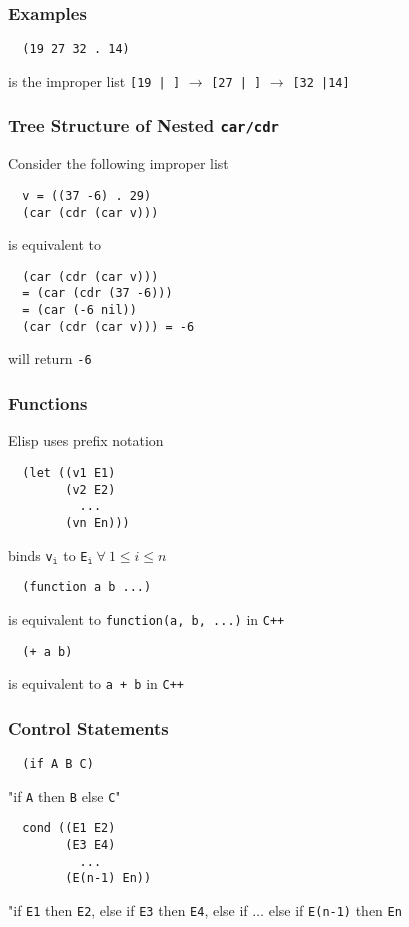 \documentclass[13pt]{article}
\begin{document}
\subsubsection*{Examples}
\begin{verbatim}
  (19 27 32 . 14) \end{verbatim}
is the improper list \texttt{[19 | ]} $\rightarrow$ \texttt{[27 | ]} $\rightarrow$ \texttt{[32 |14]}

\subsubsection{Tree Structure of Nested \texttt{car/cdr}}
Consider the following improper list
\begin{verbatim}
  v = ((37 -6) . 29)
  (car (cdr (car v))) \end{verbatim}
is equivalent to 
\begin{verbatim}
  (car (cdr (car v)))
  = (car (cdr (37 -6)))
  = (car (-6 nil))
  (car (cdr (car v))) = -6 \end{verbatim}
will return \texttt{-6}

\subsubsection{Functions}
Elisp uses prefix notation
\begin{verbatim}
  (let ((v1 E1)
        (v2 E2)
          ...
        (vn En))) \end{verbatim}
      binds \texttt{v}$_\texttt{i}$ to \texttt{E}$_\texttt{i} \ \forall \ 1 \leq i \leq n$
\begin{verbatim}
  (function a b ...) \end{verbatim}
is equivalent to \texttt{function(a, b, ...)} in \texttt{C++}
\begin{verbatim}
  (+ a b) \end{verbatim}
is equivalent to \texttt{a + b} in \texttt{C++}

\subsubsection{Control Statements}
\begin{verbatim}
  (if A B C) \end{verbatim}
"if \texttt{A} then \texttt{B} else \texttt{C}"
\begin{verbatim}
  cond ((E1 E2)
        (E3 E4)
          ...
        (E(n-1) En)) \end{verbatim}
      "if \texttt{E1} then \texttt{E2}, else if \texttt{E3} then \texttt{E4}, else if $\ldots$ else if \texttt{E(n-1)} then \texttt{En}
      
\end{document}
